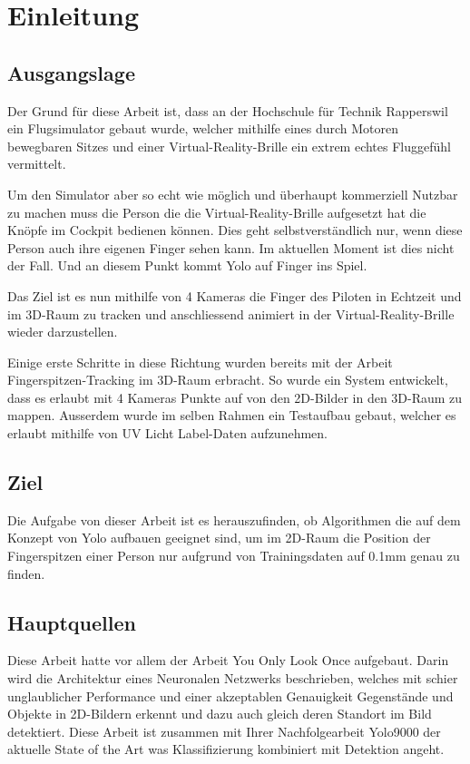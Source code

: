 \newpage
\section{Einleitung}
\subsection{Ausgangslage}
Der Grund für diese Arbeit ist, dass an der Hochschule für Technik Rapperswil ein Flugsimulator gebaut wurde, welcher  mithilfe eines durch Motoren bewegbaren Sitzes und einer Virtual-Reality-Brille ein extrem echtes Fluggefühl vermittelt.

Um den Simulator aber so echt wie möglich und überhaupt kommerziell Nutzbar zu machen muss die Person die die Virtual-Reality-Brille aufgesetzt hat die Knöpfe im Cockpit bedienen können. 
Dies geht selbstverständlich nur, wenn diese Person auch ihre eigenen Finger sehen kann.
Im aktuellen Moment ist dies nicht der Fall.
Und an diesem Punkt kommt \grqq{}Yolo auf Finger\grqq{} ins Spiel.

Das Ziel ist es nun mithilfe von 4 Kameras die Finger des Piloten in Echtzeit und im 3D-Raum zu tracken und anschliessend animiert in der Virtual-Reality-Brille wieder darzustellen.

Einige erste Schritte in diese Richtung wurden bereits mit der Arbeit \grqq{}Fingerspitzen-Tracking im 3D-Raum\grqq{} \cite{TabeasFingertracking} erbracht.
So wurde ein System entwickelt, dass es erlaubt mit 4 Kameras Punkte auf von den 2D-Bilder in den 3D-Raum zu mappen.
Ausserdem wurde im selben Rahmen ein Testaufbau gebaut, welcher es erlaubt mithilfe von UV Licht Label-Daten aufzunehmen.

\subsection{Ziel}
Die Aufgabe von dieser Arbeit ist es herauszufinden, ob Algorithmen die auf dem Konzept von Yolo\cite{yolo} aufbauen geeignet sind, um im 2D-Raum die Position der Fingerspitzen einer Person nur aufgrund von Trainingsdaten auf 0.1mm genau zu finden.

\subsection{Hauptquellen}
Diese Arbeit hatte vor allem der Arbeit \grqq{}You Only Look Once\grqq{}\cite{yolo} aufgebaut.
Darin wird die Architektur eines Neuronalen Netzwerks beschrieben, welches mit schier unglaublicher Performance und einer akzeptablen Genauigkeit Gegenstände und Objekte in 2D-Bildern erkennt und dazu auch gleich deren Standort im Bild detektiert.
Diese Arbeit ist zusammen mit Ihrer Nachfolgearbeit \grqq{}Yolo9000\grqq{} der aktuelle State of the Art was Klassifizierung kombiniert mit Detektion angeht.

